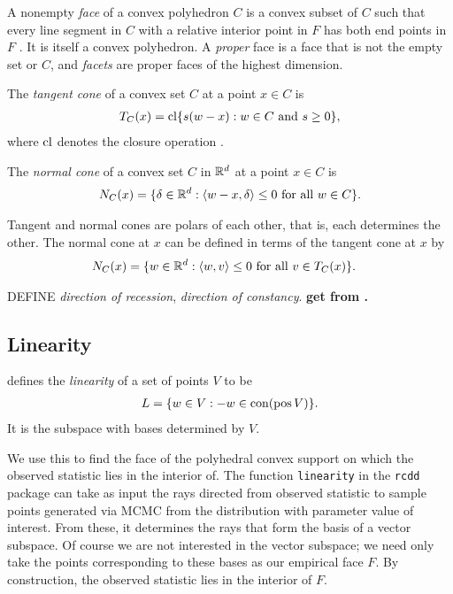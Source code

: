 A nonempty \emph{face} of a convex polyhedron $C$ is a convex subset of $C$ such that 
every line segment in $C$ with a relative interior point in $F$ has both end points in 
$F$ \citep{Rockafellar:1970}.  It is itself a convex polyhedron.
A \emph{proper} face is a face that is not the empty set or $C$, and 
\emph{facets} are proper faces of the highest dimension.

The \emph{tangent cone} of a convex set $C$ at a point $x \in C$ is
\begin{align*}
	T_C(x) = \operatorname{cl}\{s(w-x):w \in C \text{ and } s \geq 0 \},
\end{align*}
where $\operatorname{cl}$ denotes the closure operation \citep[Theorem 6.9]{Rockafellar}.  

The \emph{normal cone} of a convex set $C$ in ${\mathbb R}^d$ at a point $x \in C$ is 
\begin{align*}
	N_C(x) = \{ \delta \in {\mathbb R}^d: \langle w-x,\delta \rangle \leq 0 \text{ for all } w \in C 
\}.
\end{align*}

Tangent and normal cones are polars of each other, that is, each determines the other.  
The normal cone at $x$ can be defined in terms of the tangent cone at $x$ by
\begin{align*}
	N_C(x) 	&= \{ w \in {\mathbb R}^d: \langle  w, v  \rangle \leq 0 \text{ for all } v \in T_C(x) \}.
\end{align*}

DEFINE \emph{direction of recession}, \emph{direction of constancy}.  \textbf{get from 
\citep{Rockafellar:1970}.}

\subsection{Linearity}\label{S:linearity}
\citet{Geyer:gdor} defines the \emph{linearity} of a set of points $V$ to be
\begin{align*}
	L = \{ w \in V: -w \in \operatorname{con}( \operatorname{pos} V) \}.
\end{align*}
It is the subspace with bases determined by $V$.

We use this to find the face of the polyhedral convex support on which the observed 
statistic lies in the interior of.  The function \texttt{linearity} in the \texttt
{rcdd} package can take as input the rays directed from observed statistic to sample 
points generated via MCMC from the distribution with parameter value of interest.  
From these, it determines the rays that form the basis of a vector subspace.  Of 
course we are not interested in the vector subspace; we need only take the points 
corresponding to these bases as our empirical face $F$.  By construction, the observed 
statistic lies in the interior of $F$.

